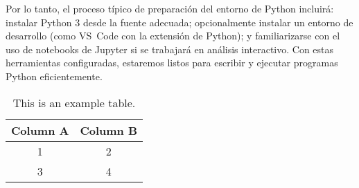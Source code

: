 Por lo tanto, el proceso típico de preparación del entorno de Python incluirá: instalar Python 3 desde la fuente adecuada; opcionalmente instalar un entorno de desarrollo (como VS Code con la extensión de Python); y familiarizarse con el uso de notebooks de Jupyter si se trabajará en análisis interactivo. Con estas herramientas configuradas, estaremos listos para escribir y ejecutar programas Python eficientemente.
\begin{table}[ht]
    \centering
    \begin{tabular}{|c|c|}
        \hline
        Column A & Column B \\
        \hline
        1 & 2 \\
        3 & 4 \\
        \hline
    \end{tabular}
    \caption{This is an example table.}
    \label{tab:example}
\end{table}
